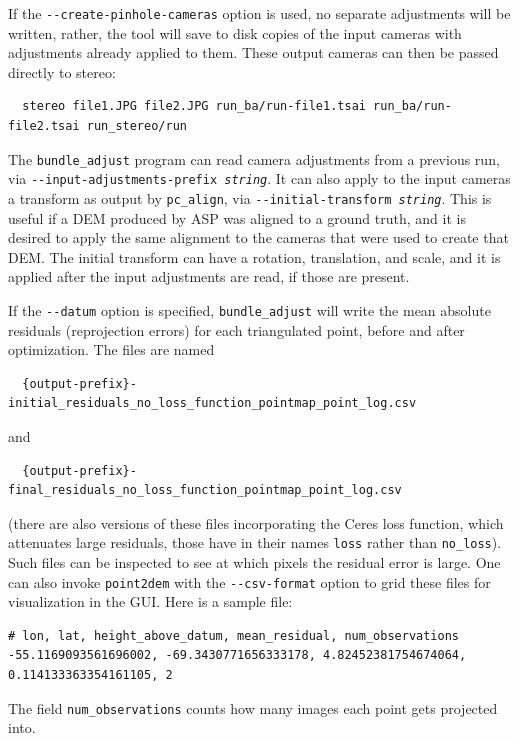 If the \texttt{-\/-create-pinhole-cameras} option is used, no separate
adjustments will be written, rather, the
tool will save to disk copies of the input cameras with adjustments
already applied to them. These output cameras can then be passed
directly to stereo:
\begin{verbatim}
  stereo file1.JPG file2.JPG run_ba/run-file1.tsai run_ba/run-file2.tsai run_stereo/run
\end{verbatim} 

The \texttt{bundle\_adjust} program can read camera adjustments from a
previous run, via \texttt{-\/-input-adjustments-prefix
\textit{string}}. It can also apply to the input cameras a transform as
output by \texttt{pc\_align}, via \texttt{-\/-initial-transform
\textit{string}}.  This is useful if a DEM produced by ASP was aligned
to a ground truth, and it is desired to apply the same alignment to the
cameras that were used to create that DEM. The initial transform can have
a rotation, translation, and scale, and it is applied after the input
adjustments are read, if those are present. 

If the \texttt{-\/-datum} option is specified, \texttt{bundle\_adjust}
will write the mean absolute residuals (reprojection errors) for each
triangulated point, before and after optimization. The files are named
\begin{verbatim}
  {output-prefix}-initial_residuals_no_loss_function_pointmap_point_log.csv
\end{verbatim}
and
\begin{verbatim}
  {output-prefix}-final_residuals_no_loss_function_pointmap_point_log.csv
\end{verbatim}
(there are also versions of these files incorporating the Ceres loss function,
which attenuates large residuals, those have in their names \texttt{loss}
rather than \texttt{no\_loss}). Such files can be inspected to see at which pixels
the residual error is large. One can also invoke \texttt{point2dem} with the 
\texttt{-\/-csv-format} option to grid these files for visualization in the GUI.
Here is a sample file:

\begin{verbatim}
# lon, lat, height_above_datum, mean_residual, num_observations
-55.1169093561696002, -69.3430771656333178, 4.82452381754674064, 0.114133363354161105, 2
\end{verbatim}

The field \texttt{num\_observations} counts how many images each point
gets projected into.

